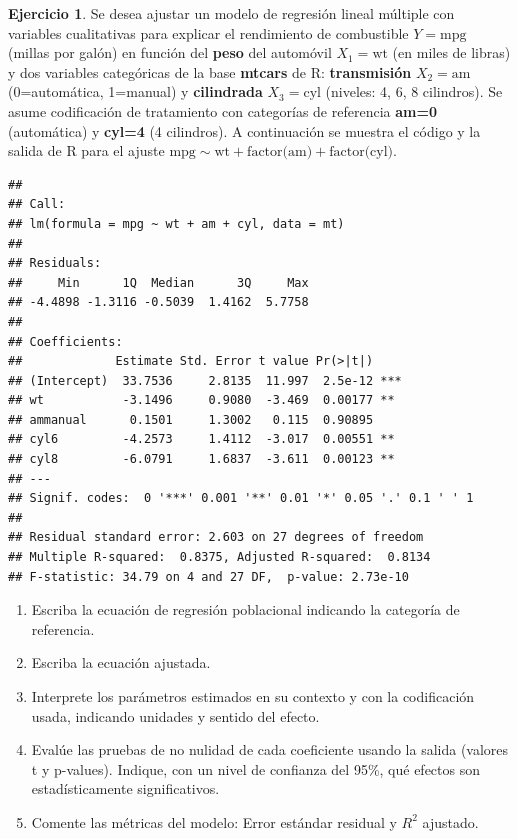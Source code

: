 \documentclass[
  11pt,
]{book}
\theoremstyle{definition}
\theoremstyle{definition}
\theoremstyle{definition}
\newtheorem{exercise}{Ejercicio}[chapter]
\theoremstyle{definition}
\theoremstyle{remark}
\begin{document}
\begin{exercise}

Se desea ajustar un modelo de regresión lineal múltiple con variables cualitativas para explicar el rendimiento de combustible \(Y=\text{mpg}\) (millas por galón) en función del \textbf{peso} del automóvil \(X_1=\text{wt}\) (en miles de libras) y dos variables categóricas de la base \textbf{mtcars} de R: \textbf{transmisión} \(X_2=\text{am}\) (0=automática, 1=manual) y \textbf{cilindrada} \(X_3=\text{cyl}\) (niveles: 4, 6, 8 cilindros). Se asume codificación de tratamiento con categorías de referencia \textbf{am=0} (automática) y \textbf{cyl=4} (4 cilindros). A continuación se muestra el código y la salida de R para el ajuste \(\text{mpg} \sim \text{wt} + \text{factor(am)} + \text{factor(cyl)}\).

\begin{verbatim}
## 
## Call:
## lm(formula = mpg ~ wt + am + cyl, data = mt)
## 
## Residuals:
##     Min      1Q  Median      3Q     Max 
## -4.4898 -1.3116 -0.5039  1.4162  5.7758 
## 
## Coefficients:
##             Estimate Std. Error t value Pr(>|t|)    
## (Intercept)  33.7536     2.8135  11.997  2.5e-12 ***
## wt           -3.1496     0.9080  -3.469  0.00177 ** 
## ammanual      0.1501     1.3002   0.115  0.90895    
## cyl6         -4.2573     1.4112  -3.017  0.00551 ** 
## cyl8         -6.0791     1.6837  -3.611  0.00123 ** 
## ---
## Signif. codes:  0 '***' 0.001 '**' 0.01 '*' 0.05 '.' 0.1 ' ' 1
## 
## Residual standard error: 2.603 on 27 degrees of freedom
## Multiple R-squared:  0.8375, Adjusted R-squared:  0.8134 
## F-statistic: 34.79 on 4 and 27 DF,  p-value: 2.73e-10
\end{verbatim}

\begin{enumerate}
\def\labelenumi{\arabic{enumi}.}
\item
  Escriba la ecuación de regresión poblacional indicando la categoría de referencia.
\item
  Escriba la ecuación ajustada.
\item
  Interprete los parámetros estimados en su contexto y con la codificación usada, indicando unidades y sentido del efecto.
\item
  Evalúe las pruebas de no nulidad de cada coeficiente usando la salida (valores t y p-values). Indique, con un nivel de confianza del 95\%, qué efectos son estadísticamente significativos.
\item
  Comente las métricas del modelo: Error estándar residual y \(R^2\) ajustado.
\end{enumerate}

\end{exercise}
\end{document}
